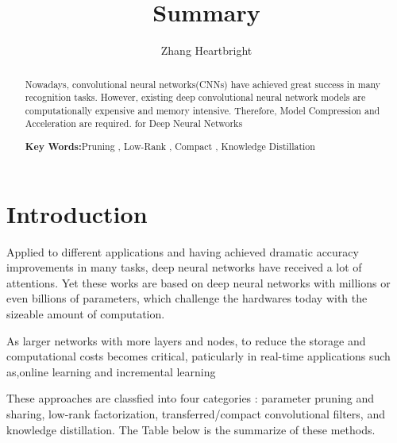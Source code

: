 \documentclass[a4paper]{article}
\title{Summary}
\author{Zhang Heartbright}
\begin{document}
	
	\maketitle
	
	\begin{abstract}
		Nowadays, convolutional neural networks(CNNs) have achieved great success in many recognition tasks. However, existing deep convolutional neural network models are computationally expensive and memory intensive. Therefore, Model Compression and Acceleration are required. 
		for Deep Neural Networks
		\par{\bfseries Key Words:}Pruning , Low-Rank , Compact , Knowledge Distillation
	\end{abstract}
	
	\section{Introduction}	
	  Applied to  different applications and having achieved dramatic accuracy improvements in many tasks, deep neural networks have received a lot of attentions. Yet these works are based on deep neural networks with millions or even billions of parameters, which challenge the hardwares today with the  sizeable amount of computation.\par 
	As larger networks with more layers and nodes, to reduce the storage and computational costs becomes critical, paticularly in real-time applications such as,online learning and incremental learning
	\par 
	These approaches are classfied into four categories : parameter
	pruning and sharing, low-rank factorization, transferred/compact
	convolutional filters, and knowledge distillation. The Table below is the summarize of these methods.
\end{document}
